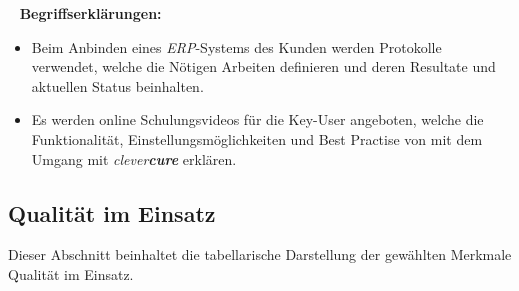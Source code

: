 \egroup
\ \newline
\newline
\textbf{Begriffserklärungen:}
\begin{itemize}
	\item Beim Anbinden eines \emph{ERP}-Systems des Kunden werden Protokolle verwendet, welche die Nötigen Arbeiten definieren und deren Resultate und aktuellen Status beinhalten. 
	\item Es werden online Schulungsvideos für die Key-User angeboten, welche die Funktionalität, Einstellungsmöglichkeiten und Best Practise von mit dem Umgang mit \emph{clever\textbf{cure}} erklären.
\end{itemize}
\newpage
\subsection{Qualität im Einsatz}
\label{sec:qualtity-quality-in-use}
Dieser Abschnitt beinhaltet die tabellarische Darstellung der gewählten Merkmale Qualität im Einsatz.
\newline
\newline
\bgroup
\def\arraystretch{1.5}%
